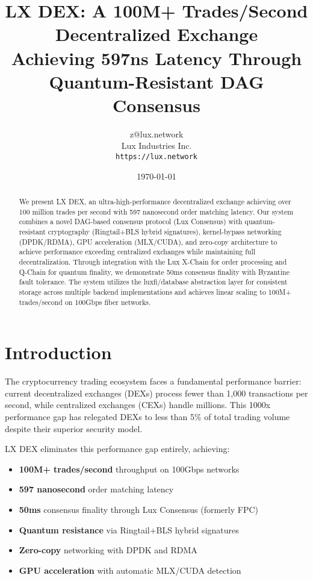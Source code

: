 \documentclass[11pt,a4paper]{article}
\title{\textbf{LX DEX: A 100M+ Trades/Second Decentralized Exchange} \\
\large{Achieving 597ns Latency Through Quantum-Resistant DAG Consensus}}
\author{
z@lux.network \\
Lux Industries Inc. \\
\texttt{https://lux.network}
}
\date{\today}
\newcommand{\lxdex}{\textsc{LX DEX}}
\begin{document}
\maketitle

\begin{abstract}
We present \lxdex{}, an ultra-high-performance decentralized exchange achieving over 100 million trades per second with 597 nanosecond order matching latency. Our system combines a novel DAG-based consensus protocol (Lux Consensus) with quantum-resistant cryptography (Ringtail+BLS hybrid signatures), kernel-bypass networking (DPDK/RDMA), GPU acceleration (MLX/CUDA), and zero-copy architecture to achieve performance exceeding centralized exchanges while maintaining full decentralization. Through integration with the Lux X-Chain for order processing and Q-Chain for quantum finality, we demonstrate 50ms consensus finality with Byzantine fault tolerance. The system utilizes the luxfi/database abstraction layer for consistent storage across multiple backend implementations and achieves linear scaling to 100M+ trades/second on 100Gbps fiber networks.
\end{abstract}

\section{Introduction}

The cryptocurrency trading ecosystem faces a fundamental performance barrier: current decentralized exchanges (DEXs) process fewer than 1,000 transactions per second, while centralized exchanges (CEXs) handle millions. This 1000x performance gap has relegated DEXs to less than 5\% of total trading volume despite their superior security model.

\lxdex{} eliminates this performance gap entirely, achieving:

\begin{itemize}
    \item \textbf{100M+ trades/second} throughput on 100Gbps networks
    \item \textbf{597 nanosecond} order matching latency
    \item \textbf{50ms} consensus finality through Lux Consensus (formerly FPC)
    \item \textbf{Quantum resistance} via Ringtail+BLS hybrid signatures
    \item \textbf{Zero-copy} networking with DPDK and RDMA
    \item \textbf{GPU acceleration} with automatic MLX/CUDA detection
\end{itemize}
\end{document}
